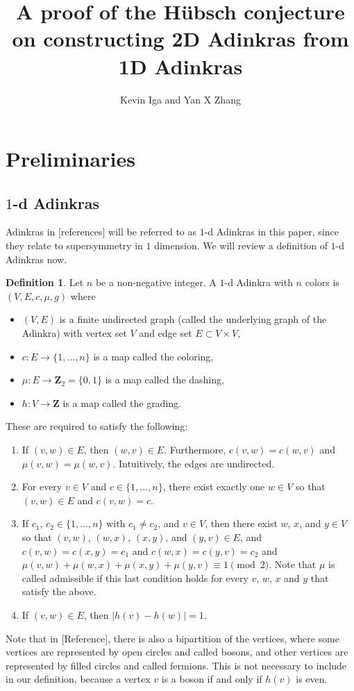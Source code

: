 \documentclass[12pt,twoside,singlespace]{article}
\title{A proof of the H\"ubsch conjecture on constructing 2D Adinkras from 1D Adinkras}
\author{Kevin Iga and Yan X Zhang}
\numberwithin{equation}{section}
\theoremstyle{definition}
\newtheorem{definition}[equation]{Definition}
\newcommand{\ZZ}{\mathbf{Z}}
\begin{document}
\pagestyle{plain}

\maketitle

\section{Preliminaries}

\subsection{$1$-d Adinkras}
Adinkras in [references] will be referred to as $1$-d Adinkras in this paper, since they relate to supersymmetry in $1$ dimension.  We will review a definition of $1$-d Adinkras now.

\begin{definition}
Let $n$ be a non-negative integer.  A $1$-d Adinkra with $n$ colors is $(V,E,c,\mu,g)$ where
\begin{itemize}
\item $(V,E)$ is a finite undirected graph (called the underlying graph of the Adinkra) with vertex set $V$ and edge set $E\subset V\times V$,
\item $c:E\to \{1,\ldots,n\}$ is a map called the coloring,
\item $\mu:E\to \ZZ_2=\{0,1\}$ is a map called the dashing,
\item $h:V\to\ZZ$ is a map called the grading.
\end{itemize}

These are required to satisfy the following:
\begin{enumerate}
\item If $(v,w)\in E$, then $(w,v)\in E$.  Furthermore, $c(v,w)=c(w,v)$ and $\mu(v,w)=\mu(w,v)$.  Intuitively, the edges are undirected.
\item For every $v\in V$ and $c\in \{1,\ldots,n\}$, there exist exactly one $w\in V$ so that $(v,w)\in E$ and $c(v,w)=c$.
\item If $c_1$, $c_2\in \{1,\ldots,n\}$ with $c_1\not=c_2$, and $v\in V$, then there exist $w$, $x$, and $y\in V$ so that $(v,w)$, $(w,x)$, $(x,y)$, and $(y,v)\in E$, and $c(v,w)=c(x,y)=c_1$ and $c(w,x)=c(y,v)=c_2$ and $\mu(v,w)+\mu(w,x)+\mu(x,y)+\mu(y,v)\equiv 1\pmod{2}$.  Note that $\mu$ is called admissible if this last condition holds for every $v$, $w$, $x$ and $y$ that satisfy the above.
\item If $(v,w)\in E$, then $|h(v)-h(w)|=1$.
\end{enumerate}
\end{definition}
Note that in [Reference], there is also a bipartition of the vertices, where some vertices are represented by open circles and called bosons, and other vertices are represented by filled circles and called fermions.  This is not necessary to include in our definition, because a vertex $v$ is a boson if and only if $h(v)$ is even.
\end{document}
